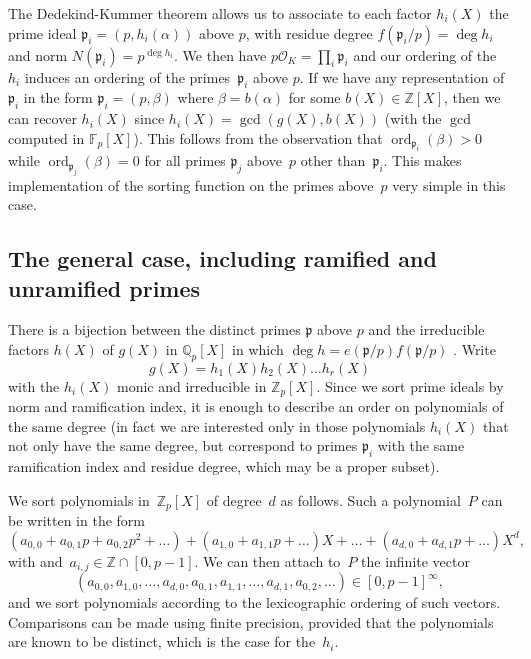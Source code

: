 \documentclass{article}
\def\Z{{\mathbb Z}}
\def\Q{{\mathbb Q}}
\def\F{{\mathbb F}}
\def\OO{{\mathcal O}}
\def\p{{\mathfrak p}}
\DeclareMathOperator{\disc}{disc}
\DeclareMathOperator{\ord}{ord}
\begin{document}
The Dedekind-Kummer theorem allows us to associate to each factor
$h_i(X)$ the prime ideal $\p_i=(p,h_i(\alpha))$ above $p$, with
residue degree $f(\p_i/p)=\deg h_i$ and norm $N(\p_i)=p^{\deg h_i}$.
We then have $p\OO_K=\prod_i \p_i$ and our ordering of the $h_i$
induces an ordering of the primes~$\p_i$ above $p$.  If we have any
representation of $\p_i$ in the form $\p_i=(p,\beta)$ where
$\beta=b(\alpha)$ for some $b(X)\in\Z[X]$, then we can recover
$h_i(X)$ since $h_i(X)=\gcd(g(X),b(X))$ (with the $\gcd$ computed in
$\F_p[X]$).  This follows from the observation that
$\ord_{\p_i}(\beta)>0$ while $\ord_{\p_j}(\beta)=0$ for all primes
$\p_j$ above~$p$ other than~$\p_i$.  This makes implementation of the
sorting function on the primes above~$p$ very simple in this case.

\subsection{The general case, including ramified and unramified primes}

There is a bijection between the distinct primes $\p$ above $p$ and
the irreducible factors $h(X)$ of $g(X)$ in $\Q_p[X]$ in which $\deg h
= e(\p/p)f(\p/p)$ \cite[Theorem 3.8 (d)]{Janusz}.  Write
\[
  g(X) = h_1(X)h_2(X)\dots h_r(X)
\]
with the $h_i(X)$ monic and irreducible in $\Z_p[X]$. Since we sort prime ideals
by norm and ramification index, it is enough to describe an order on polynomials
of the same degree (in fact we are interested only in those polynomials $h_i(X)$
that not only have the same degree, but correspond to primes $\p_i$ with the same
ramification index and residue degree, which may be a proper subset).

We sort polynomials in~$\Z_p[X]$ of degree~$d$ as follows. Such a polynomial~$P$
can be written in the form
\[
  (a_{0,0}+a_{0,1}p+a_{0,2}p^2+\dots) + (a_{1,0}+a_{1,1}p+\dots)X
  + \dots + (a_{d,0}+a_{d,1}p+\dots)X^d,
\]
with and~$a_{i,j}\in\Z\cap[0,p-1]$. We can then attach to~$P$ the infinite
vector
\[
(a_{0,0},a_{1,0},\dots,a_{d,0},a_{0,1},a_{1,1},\dots,a_{d,1},a_{0,2},\dots)\in [0,p-1]^\infty,
\]
and we sort polynomials according to the lexicographic ordering of such vectors.
Comparisons can be made using finite precision, provided that the polynomials are known to be
distinct, which is the case for the~$h_i$.

\end{document}
